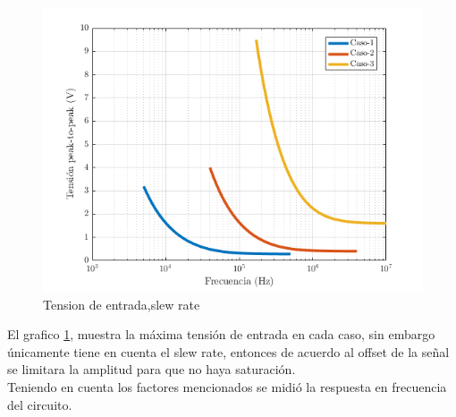 \documentclass[../../main.tex]{subfiles}
\begin{document}
\begin{figure}[H]
\centering
\includegraphics[width=1\textwidth]{slew-rate-inv}
\caption{Tension de entrada,slew rate} \label{fig=srInv}
\end{figure}

El grafico \ref{fig=srInv}, muestra la máxima tensión de entrada en cada caso, sin embargo únicamente tiene en cuenta el slew rate, entonces de acuerdo al offset de la señal se limitara la amplitud para que no haya saturación.
\\
Teniendo en cuenta los factores mencionados se midió la respuesta en frecuencia del circuito.
\end{document}
